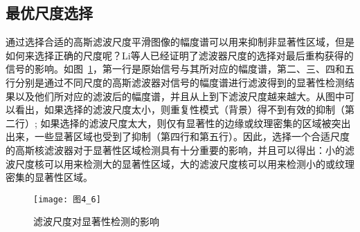 \subsection{最优尺度选择}
\label{4_1_3}

通过选择合适的高斯滤波尺度平滑图像的幅度谱可以用来抑制非显著性区域，但是如何来选择正确的尺度呢？Li等人\cite{LiJianTPAMI2013Scale}已经证明了滤波器尺度的选择对最后重构获得的信号的影响。如图~\ref{图4_6}，第一行是原始信号与其所对应的幅度谱，第二、三、四和五行分别是通过不同尺度的高斯滤波器对信号的幅度谱进行滤波得到的显著性检测结果以及他们所对应的滤波后的幅度谱，并且从上到下滤波尺度越来越大。从图中可以看出，如果选择的滤波尺度太小，则重复性模式（背景）得不到有效的抑制（第二行）; 如果选择的滤波尺度太大，则仅有显著性的边缘或纹理密集的区域被突出出来，一些显著区域也受到了抑制（第四行和第五行）。因此，选择一个合适尺度的高斯核滤波器对于显著性区域检测具有十分重要的影响，并且可以得出：小的滤波尺度核可以用来检测大的显著性区域，大的滤波尺度核可以用来检测小的或纹理密集的显著性区域。
\begin{figure}[h]
  \centering
  \texttt{[image: 图4\_6]}
  \caption{滤波尺度对显著性检测的影响}   
  \label{图4_6} 
\end{figure}

